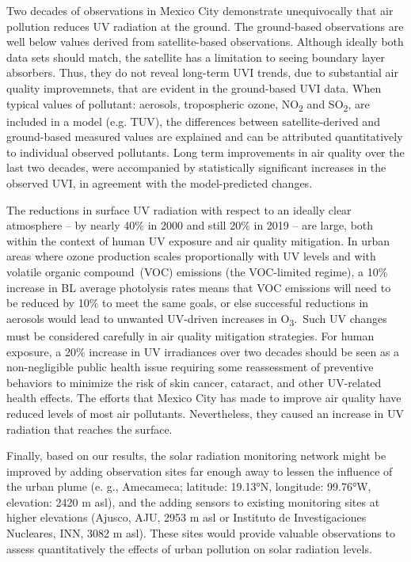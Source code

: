 \documentclass[journal=jacsat,manuscript=article]{achemso}
\begin{document}
Two decades of observations in Mexico City demonstrate unequivocally
that air pollution reduces UV radiation at the ground. The ground-based
observations are well below values derived from satellite-based
observations. Although ideally both data sets should match,
the satellite has a limitation to seeing boundary layer absorbers.
Thus, they do not reveal long-term UVI trends, due to substantial air quality improvemnets, that are evident in the ground-based UVI data.
When typical values of pollutant: aerosols,
tropospheric ozone, NO\textsubscript{2}
and SO\textsubscript{2}, are included in a model (e.g. TUV), the
differences between satellite-derived and ground-based measured values
are explained and can be attributed quantitatively to individual
observed pollutants. Long term improvements in air quality over the last two decades,
were accompanied by statistically significant increases in the
observed UVI, in agreement with the model-predicted changes.

The reductions in surface UV radiation with respect to an ideally clear
atmosphere -- by nearly 40\% in 2000 and still 20\% in 2019 -- are
large, both within the context of human UV exposure and air quality
mitigation. In urban areas where ozone production scales proportionally
with UV levels and with volatile organic compound~(VOC) emissions (the
VOC-limited regime), a 10\% increase in BL average photolysis rates
means that VOC emissions will need to be reduced by 10\% to meet the
same goals, or else successful reductions in aerosols would lead to
unwanted UV-driven increases in O\textsubscript{3}.~Such UV changes must
be considered carefully in air quality mitigation strategies. For human
exposure, a 20\% increase in UV irradiances over two decades should be
seen as a non-negligible public health issue requiring some reassessment
of preventive behaviors to minimize the risk of skin cancer, cataract,
and other UV-related health effects. The efforts that Mexico City has
made to improve air quality have reduced levels
of most air pollutants. Nevertheless, they caused an increase in UV
radiation that reaches the surface.

Finally, based on our results, the solar radiation monitoring network might
be improved by adding observation sites far enough away to lessen the
influence of the urban plume (e. g., Amecameca; latitude: 19.13°N, longitude: 99.76°W, elevation: 2420 m asl),
and the adding sensors to existing monitoring sites at higher elevations
(Ajusco, AJU, 2953 m asl or Instituto de Investigaciones Nucleares, INN, 3082 m asl).
These sites would provide valuable observations to assess quantitatively the effects of urban pollution on solar radiation levels.
\end{document}
